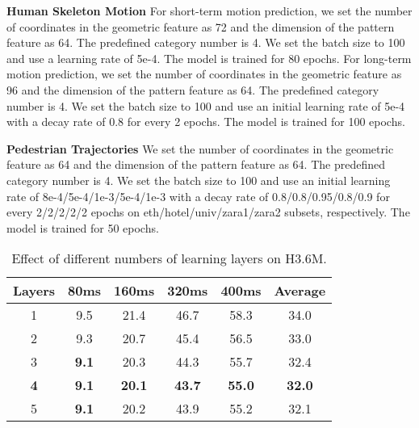 \documentclass[10pt,twocolumn,letterpaper]{article}
\begin{document}
\vspace{0.2cm}
\noindent\textbf{Human Skeleton Motion} For short-term motion prediction, we set the number of coordinates in the geometric feature  as 72 and the dimension of the pattern feature  as 64. The predefined category number  is 4. We set the batch size to 100 and use a learning rate of 5e-4. The model is trained for 80 epochs. For long-term motion prediction, we set the number of coordinates in the geometric feature  as 96 and the dimension of the pattern feature  as 64. The predefined category number  is 4. We set the batch size to 100 and use an initial learning rate of 5e-4 with a decay rate of 0.8 for every 2 epochs. The model is trained for 100 epochs.

\vspace{0.2cm}
\noindent\textbf{Pedestrian Trajectories} We set the number of coordinates in the geometric feature  as 64 and the dimension of the pattern feature  as 64. The predefined category number  is 4. We set the batch size to 100 and use an initial learning rate of 8e-4/5e-4/1e-3/5e-4/1e-3 with a decay rate of 0.8/0.8/0.95/0.8/0.9 for every 2/2/2/2/2 epochs on eth/hotel/univ/zara1/zara2 subsets, respectively. The model is trained for 50 epochs.

\begin{table}[t]
  \centering
  \renewcommand\arraystretch{1.0}
    \setlength{\tabcolsep}{6pt}
  \footnotesize
  \caption{\small Effect of different numbers of learning layers on H3.6M.}
  \vspace{-3mm}
\small
    \begin{tabular}{c|ccccc}
    \toprule
        Layers  & 80ms & 160ms & 320ms & 400ms & Average \\
    \midrule
       1 & 9.5 & 21.4 & 46.7 &58.3 & 34.0\\
       2 & 9.3 & 20.7 &45.4&56.5 & 33.0   \\
       3 & \textbf{9.1} & 20.3 & 44.3 & 55.7 & 32.4\\
       \textbf{4} & \textbf{9.1} &\textbf{20.1}& \textbf{43.7} &\textbf{55.0} & \textbf{32.0}\\
       5 & \textbf{9.1}& 20.2& 43.9 & 55.2 & 32.1\\
    
    \bottomrule
    \end{tabular}\label{table:abltion_layers}\vspace{-5mm}
\end{table}
\end{document}
